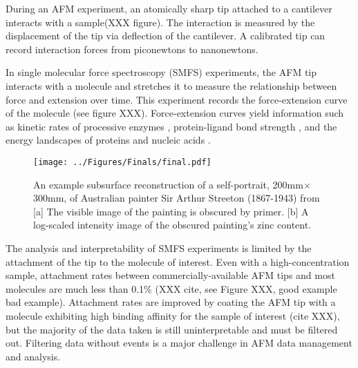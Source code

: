 \documentclass[%
  aip,12pt,tightenlines,
  amsthm,
 amsmath,amssymb
]{article}
\newcommand{\fLabel}[1]{\label{figure:#1}}
\newcommand{\pcaption}[1]{\caption{\noindent#1}}
\newcommand{\pl}[0]{\vspace{6pt}}
\newcommand{\pEndF}[0]{ \\ }
\newcommand{\pStartF}[0]{ }
\newcommand{\singlemol}[0]{SMFS}
\newcommand{\citePRH}[1]{\cite{#1}}
\begin{document}
During an AFM experiment, an atomically sharp tip attached to a cantilever interacts with a sample(XXX figure). The interaction is measured by the displacement of the tip via deflection of the cantilever. A calibrated tip can record interaction forces from piconewtons to nanonewtons. \pl

In single molecular force spectroscopy (\singlemol{}) experiments, the AFM tip interacts with a molecule and stretches it to measure the relationship between force and extension over time. This experiment records the force-extension curve of the molecule (see figure XXX). Force-extension curves yield information such as kinetic rates of processive enzymes \citePRH{comstock_direct_2015}, protein-ligand bond strength \citePRH{yuan_energy_2000}, and the energy landscapes of proteins and nucleic acids \citePRH{dudko_Theory_2008}. \pl

\begin{figure}
\centering
\texttt{[image: ../Figures/Finals/final.pdf]}%
\pcaption{\noindent\fLabel{Cartoon}\pStartF An example subsurface reconstruction of a self-portrait, 200mm$\times$300mm, of Australian painter Sir Arthur Streeton (1867-1943) from \citet{howard_high-definition_2012} [a] The visible image of the painting is obscured by primer. [b] A log-scaled intensity image of the obscured painting's zinc content. \pEndF }
\end{figure}


The analysis and interpretability of \singlemol{} experiments is limited by the attachment of the tip to the molecule of interest. Even with a high-concentration sample, attachment rates between commercially-available AFM tips and most molecules are much less than 0.1\% (XXX cite, see Figure XXX, good example bad example). Attachment rates are improved by coating the AFM tip with a molecule exhibiting high binding affinity for the sample of interest (cite XXX), but the majority of the data taken is still uninterpretable and must be filtered out. Filtering data without events is a major challenge in AFM data management and analysis.\pl
\end{document}
